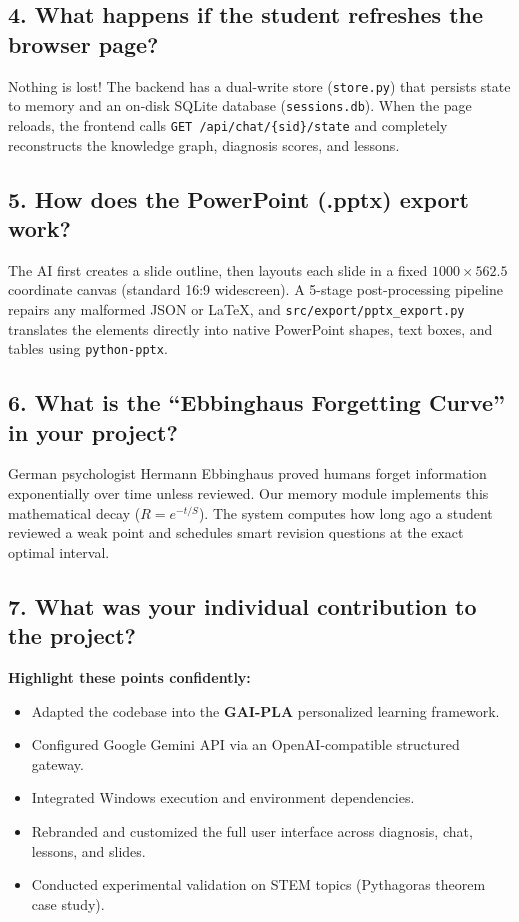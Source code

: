 \documentclass[11pt,a4paper]{article}
\begin{document}
\subsection*{4. What happens if the student refreshes the browser page?}
\begin{answerbox}
Nothing is lost! The backend has a dual-write store (\texttt{store.py}) that persists state to memory and an on-disk SQLite database (\texttt{sessions.db}). When the page reloads, the frontend calls \texttt{GET /api/chat/\{sid\}/state} and completely reconstructs the knowledge graph, diagnosis scores, and lessons.
\end{answerbox}

\subsection*{5. How does the PowerPoint (.pptx) export work?}
\begin{answerbox}
The AI first creates a slide outline, then layouts each slide in a fixed $1000 \times 562.5$ coordinate canvas (standard 16:9 widescreen). A 5-stage post-processing pipeline repairs any malformed JSON or LaTeX, and \texttt{src/export/pptx\_export.py} translates the elements directly into native PowerPoint shapes, text boxes, and tables using \texttt{python-pptx}.
\end{answerbox}

\subsection*{6. What is the ``Ebbinghaus Forgetting Curve'' in your project?}
\begin{answerbox}
German psychologist Hermann Ebbinghaus proved humans forget information exponentially over time unless reviewed. Our memory module implements this mathematical decay ($R = e^{-t/S}$). The system computes how long ago a student reviewed a weak point and schedules smart revision questions at the exact optimal interval.
\end{answerbox}

\subsection*{7. What was your individual contribution to the project?}
\begin{answerbox}
\textbf{Highlight these points confidently:}
\begin{itemize}[noitemsep]
    \item Adapted the codebase into the \textbf{GAI-PLA} personalized learning framework.
    \item Configured Google Gemini API via an OpenAI-compatible structured gateway.
    \item Integrated Windows execution and environment dependencies.
    \item Rebranded and customized the full user interface across diagnosis, chat, lessons, and slides.
    \item Conducted experimental validation on STEM topics (Pythagoras theorem case study).
\end{itemize}
\end{answerbox}
\end{document}
